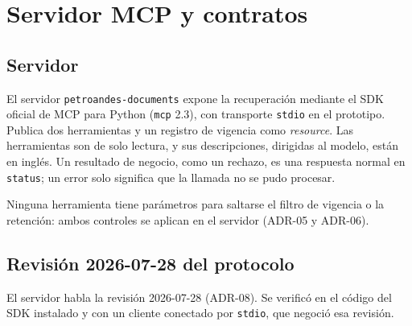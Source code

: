 \section{Servidor MCP y contratos}\label{sec:contrato-mcp}

\subsection{Servidor}

El servidor \texttt{petroandes-documents} expone la recuperación mediante el SDK oficial de MCP para Python (\texttt{mcp} 2.3), con transporte \texttt{stdio} en el prototipo. Publica dos herramientas y un registro de vigencia como \emph{resource}. Las herramientas son de solo lectura, y sus descripciones, dirigidas al modelo, están en inglés. Un resultado de negocio, como un rechazo, es una respuesta normal en \texttt{status}; un error solo significa que la llamada no se pudo procesar.

Ninguna herramienta tiene parámetros para saltarse el filtro de vigencia o la retención: ambos controles se aplican en el servidor (ADR-05 y ADR-06).

\subsection{Revisión 2026-07-28 del protocolo}\label{sec:mcp-revision}

El servidor habla la revisión 2026-07-28 (ADR-08). Se verificó en el código del SDK instalado y con un cliente conectado por \texttt{stdio}, que negoció esa revisión.


